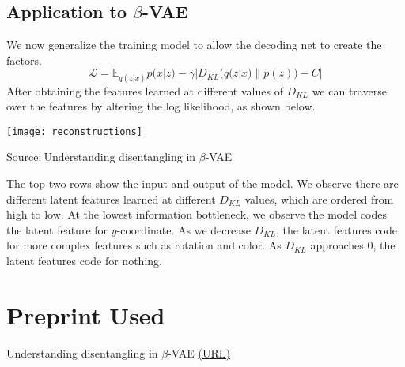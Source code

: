 \documentclass{article}
\begin{document}
\subsection{Application to $\beta$-VAE}
We now generalize the training model to allow the decoding net to create the factors.
\begin{equation}
    \mathcal{L}= \mathbb{E}_{q(z|x)}p(x|z) -\gamma|D_{KL}(q(z|x)\parallel p(z))-C|
\end{equation}
After obtaining the features learned at different values of $D_{KL}$ we can traverse over the features by altering the log likelihood, as shown below.
\begin{center}
    \texttt{[image: reconstructions]}
    \caption{Source:$~$Understanding disentangling in $\beta$-VAE}
\end{center}
The top two rows show the input and output of the model. We observe there are different latent features learned at different $D_{KL}$ values, which are ordered from high to low. At the lowest information bottleneck, we observe the model codes the latent feature for $y$-coordinate. As we decrease $D_{KL}$, the latent features code for more complex features such as rotation and color. As $D_{KL}$ approaches $0$, the latent features code for nothing.

\section{Preprint Used}
Understanding disentangling in $\beta$-VAE \href{https://arxiv.org/pdf/1804.03599.pdf}{(URL)} 
\end{document}

